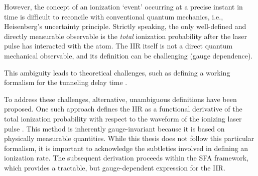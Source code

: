 However, the concept of an ionization `event' occurring at a precise instant in time is difficult to reconcile with conventional quantum mechanics, i.e., Heisenberg's uncertainty principle. 
Strictly speaking, the only well-defined and directly measurable observable is the \emph{total} ionization probability after the laser pulse has interacted with the atom. 
The IIR itself is not a direct quantum mechanical observable, and its definition can be challenging (gauge dependence).

This ambiguity leads to theoretical challenges, such as defining a working formalism for the tunneling delay time \cite{Ivanov2018}.

To address these challenges, alternative, unambiguous definitions have been proposed. One such approach defines the IIR as a functional derivative of the total ionization probability with respect to the waveform of the ionizing laser pulse \cite{Ivanov2018}. 
This method is inherently gauge-invariant because it is based on physically measurable quantities. 
While this thesis does not follow this particular formalism, it is important to acknowledge the subtleties involved in defining an ionization rate. 
The subsequent derivation proceeds within the SFA framework, which provides a tractable, but gauge-dependent expression for the IIR.



